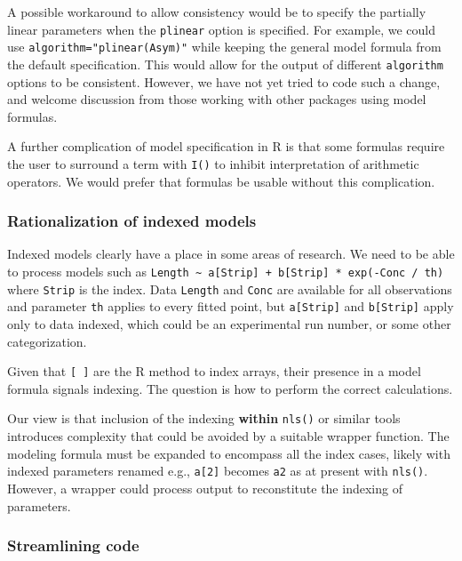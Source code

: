 \documentclass[
]{article}
\begin{document}
A possible workaround to allow consistency would be to specify the
partially linear parameters when the \texttt{plinear} option is
specified. For example, we could use \texttt{algorithm="plinear(Asym)"}
while keeping the general model formula from the default specification.
This would allow for the output of different \texttt{algorithm} options
to be consistent. However, we have not yet tried to code such a change,
and welcome discussion from those working with other packages using
model formulas.

A further complication of model specification in R is that some formulas
require the user to surround a term with \texttt{I()} to inhibit
interpretation of arithmetic operators. We would prefer that formulas be
usable without this complication.

\hypertarget{rationalization-of-indexed-models}{%
\subsubsection{Rationalization of indexed
models}\label{rationalization-of-indexed-models}}

Indexed models clearly have a place in some areas of research. We need
to be able to process models such as
\texttt{Length\ \textasciitilde{}\ a{[}Strip{]}\ +\ b{[}Strip{]}\ *\ exp(-Conc\ /\ th)}
where \texttt{Strip} is the index. Data \texttt{Length} and
\texttt{Conc} are available for all observations and parameter
\texttt{th} applies to every fitted point, but \texttt{a{[}Strip{]}} and
\texttt{b{[}Strip{]}} apply only to data indexed, which could be an
experimental run number, or some other categorization.

Given that \texttt{{[}\ {]}} are the R method to index arrays, their
presence in a model formula signals indexing. The question is how to
perform the correct calculations.

Our view is that inclusion of the indexing \textbf{within}
\texttt{nls()} or similar tools introduces complexity that could be
avoided by a suitable wrapper function. The modeling formula must be
expanded to encompass all the index cases, likely with indexed
parameters renamed e.g., \texttt{a{[}2{]}} becomes \texttt{a2} as at
present with \texttt{nls()}. However, a wrapper could process output to
reconstitute the indexing of parameters.

\hypertarget{streamlining-code}{%
\subsubsection{Streamlining code}\label{streamlining-code}}
\end{document}
